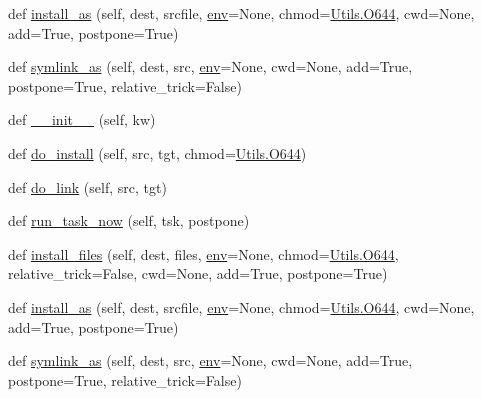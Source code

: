 \begin{DoxyCompactItemize}
\item 
def \hyperlink{classwaflib_1_1_build_1_1_install_context_a7a653c97bec879bfd813d525c8c0caf3}{install\+\_\+as} (self, dest, srcfile, \hyperlink{classwaflib_1_1_build_1_1_build_context_ac3b464a969bc6c898c739b6d820b2219}{env}=None, chmod=\hyperlink{namespacewaflib_1_1_utils_ade9dd27fadbf52a0641bbff06d3dd3ac}{Utils.\+O644}, cwd=None, add=True, postpone=True)
\item 
def \hyperlink{classwaflib_1_1_build_1_1_install_context_a25a3977cdde84cb8b06ce8316acc686b}{symlink\+\_\+as} (self, dest, src, \hyperlink{classwaflib_1_1_build_1_1_build_context_ac3b464a969bc6c898c739b6d820b2219}{env}=None, cwd=None, add=True, postpone=True, relative\+\_\+trick=False)
\item 
def \hyperlink{classwaflib_1_1_build_1_1_install_context_a92d1f07459687e8da5a0e871eeb462f0}{\+\_\+\+\_\+init\+\_\+\+\_\+} (self, kw)
\item 
def \hyperlink{classwaflib_1_1_build_1_1_install_context_a389ce541ae521e6e4e616cfddf89bd7e}{do\+\_\+install} (self, src, tgt, chmod=\hyperlink{namespacewaflib_1_1_utils_ade9dd27fadbf52a0641bbff06d3dd3ac}{Utils.\+O644})
\item 
def \hyperlink{classwaflib_1_1_build_1_1_install_context_ac012afc7dd8fb657141d28ad571392f4}{do\+\_\+link} (self, src, tgt)
\item 
def \hyperlink{classwaflib_1_1_build_1_1_install_context_ab9691686f803c54151ec5bbc92717a0f}{run\+\_\+task\+\_\+now} (self, tsk, postpone)
\item 
def \hyperlink{classwaflib_1_1_build_1_1_install_context_af07f1f67998c0f4a6d20361cd28ee0bc}{install\+\_\+files} (self, dest, files, \hyperlink{classwaflib_1_1_build_1_1_build_context_ac3b464a969bc6c898c739b6d820b2219}{env}=None, chmod=\hyperlink{namespacewaflib_1_1_utils_ade9dd27fadbf52a0641bbff06d3dd3ac}{Utils.\+O644}, relative\+\_\+trick=False, cwd=None, add=True, postpone=True)
\item 
def \hyperlink{classwaflib_1_1_build_1_1_install_context_a7a653c97bec879bfd813d525c8c0caf3}{install\+\_\+as} (self, dest, srcfile, \hyperlink{classwaflib_1_1_build_1_1_build_context_ac3b464a969bc6c898c739b6d820b2219}{env}=None, chmod=\hyperlink{namespacewaflib_1_1_utils_ade9dd27fadbf52a0641bbff06d3dd3ac}{Utils.\+O644}, cwd=None, add=True, postpone=True)
\item 
def \hyperlink{classwaflib_1_1_build_1_1_install_context_a25a3977cdde84cb8b06ce8316acc686b}{symlink\+\_\+as} (self, dest, src, \hyperlink{classwaflib_1_1_build_1_1_build_context_ac3b464a969bc6c898c739b6d820b2219}{env}=None, cwd=None, add=True, postpone=True, relative\+\_\+trick=False)
\end{DoxyCompactItemize}
